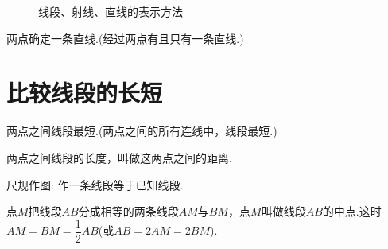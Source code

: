 \documentclass[fontset=windows]{ctexrep}
\begin{document}
\begin{figure}[htbp]
\begin{minipage}[b]{0.5\linewidth}
{
        }
    \end{minipage}
    \medskip
    \begin{minipage}[b]{0.5\linewidth}
        \centering
    \end{minipage}
    \caption{线段、射线、直线的表示方法}
\end{figure}
\par {\heiti 两点确定一条直线.}(经过两点有且只有一条直线.)
\section{比较线段的长短}
\par {\heiti 两点之间线段最短.}(两点之间的所有连线中，线段最短.)
\par 两点之间线段的长度，叫做这{\heiti 两点之间的距离}.
\par 尺规作图: 作一条线段等于已知线段.
\par 点$M$把线段$AB$分成相等的两条线段$AM$与$BM$，点$M$叫做线段$AB$的{\heiti 中点}.这时$AM=BM=\dfrac12 AB$(或$AB=2AM=2BM$).
\end{document}

